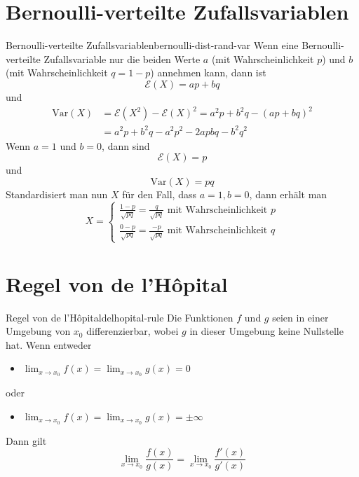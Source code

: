 \documentclass[11pt]{report} %
\begin{document}
\section{Bernoulli-verteilte Zufallsvariablen}
\begin{Beweis}{Bernoulli-verteilte Zufallsvariablen}{bernoulli-dist-rand-var}
    Wenn eine Bernoulli-verteilte Zufallsvariable nur die beiden Werte $a$ (mit Wahrscheinlichkeit $p$) und $b$ (mit Wahrscheinlichkeit $q=1-p$) annehmen kann, dann ist $$\mathcal{E}(X)=ap+bq$$und \begin{align*}
        \text{Var}(X)&=\mathcal{E}(X^2)-\mathcal{E}(X)^2=a^2p+b^2q-(ap+bq)^2\\
        &=a^2p+b^2q-a^2p^2-2apbq-b^2q^2
    \end{align*}
    Wenn $a=1$ und $b=0$, dann sind $$\mathcal{E}(X)=p$$ und $$\text{Var}(X)=pq$$
    Standardisiert man nun $X$ für den Fall, dass $a=1, b=0$, dann erhält man
    $$X=\begin{cases}
        \frac{1-p}{\sqrt{pq}}=\frac{q}{\sqrt{pq}} \text{ mit Wahrscheinlichkeit $p$}\\
        \frac{0-p}{\sqrt{pq}}=\frac{-p}{\sqrt{pq}} \text{ mit Wahrscheinlichkeit $q$}
    \end{cases}$$
\end{Beweis}

\section{Regel von de l'Hôpital}
\begin{Theorem}{Regel von de l'Hôpital}{delhopital-rule}
Die Funktionen $f$ und $g$ seien in einer Umgebung von $x_0$ differenzierbar, wobei $g$ in dieser Umgebung keine Nullstelle hat. Wenn entweder
\begin{itemize}
    \item $\displaystyle \lim_{x\to x_0}f(x)=\lim_{x\to x_0}g(x)=0$
\end{itemize}
oder
\begin{itemize}
    \item $\displaystyle \lim_{x\to x_0}f(x)=\lim_{x\to x_0}g(x)=\pm \infty$
\end{itemize}
Dann gilt
$$\lim_{x\to x_0}\frac{f(x)}{g(x)}=\lim_{x\to x_0}\frac{f'(x)}{g'(x)}$$
\end{Theorem}
\end{document}

